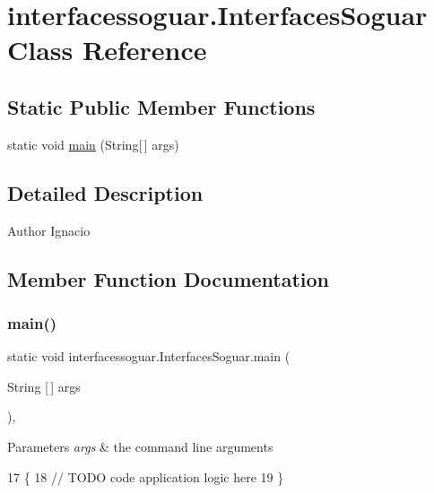 \hypertarget{classinterfacessoguar_1_1_interfaces_soguar}{}\section{interfacessoguar.\+Interfaces\+Soguar Class Reference}
\label{classinterfacessoguar_1_1_interfaces_soguar}
\subsection*{Static Public Member Functions}
\begin{DoxyCompactItemize}
\item 
static void \mbox{\hyperlink{classinterfacessoguar_1_1_interfaces_soguar_a0f163859a5ccee790fdb3ebd4ba3e8bc}{main}} (String\mbox{[}$\,$\mbox{]} args)
\end{DoxyCompactItemize}


\subsection{Detailed Description}
\begin{DoxyAuthor}{Author}
Ignacio 
\end{DoxyAuthor}


\subsection{Member Function Documentation}
\mbox{\label{classinterfacessoguar_1_1_interfaces_soguar_a0f163859a5ccee790fdb3ebd4ba3e8bc}} 
\subsubsection{\texorpdfstring{main()}{main()}}
{\footnotesize\ttfamily static void interfacessoguar.\+Interfaces\+Soguar.\+main (\begin{DoxyParamCaption}\item[{String \mbox{[}$\,$\mbox{]}}]{args }\end{DoxyParamCaption})\hspace{0.3cm}{\ttfamily [inline]}, {\ttfamily [static]}}


\begin{DoxyParams}{Parameters}
{\em args} & the command line arguments \\
\hline
\end{DoxyParams}

\begin{DoxyCode}
17                                            \{
18         \textcolor{comment}{// TODO code application logic here}
19     \}
\end{DoxyCode}
